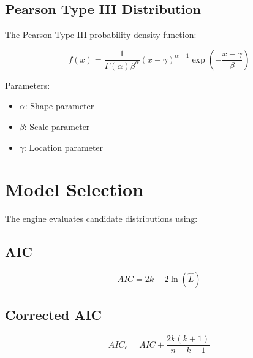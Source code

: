 \documentclass[11pt,a4paper]{article}
\begin{document}
\subsection{Pearson Type III Distribution}



The Pearson Type III probability density function:


\begin{equation}

f(x)=
\frac{
1
}{
\Gamma(\alpha)\beta^\alpha
}
(x-\gamma)^{\alpha-1}
\exp
\left(
-\frac{x-\gamma}{\beta}
\right)

\end{equation}



Parameters:


\begin{itemize}

\item $\alpha$: Shape parameter

\item $\beta$: Scale parameter

\item $\gamma$: Location parameter

\end{itemize}




\section{Model Selection}


The engine evaluates candidate distributions using:



\subsection{AIC}


\begin{equation}

AIC=2k-2\ln(\hat{L})

\end{equation}



\subsection{Corrected AIC}


\begin{equation}

AIC_c
=
AIC+
\frac{2k(k+1)}
{n-k-1}

\end{equation}
\end{document}
